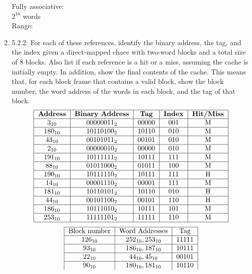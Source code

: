 \documentclass[10pt,letterpaper]{article}
\begin{document}
\begin{enumerate}[label=\textbf{Problem \arabic*.}]
Fully associative:\\
$2^16$ words\\
Range:
\item 5.2.2: For each of these references, identify the binary address, the tag, and the index given a direct-mapped chace with two-word blocks and a total size of 8 blocks. Also list if each reference is a hit or a miss, assuming the cache is initially empty. In addition, show the final contents of the cache. This means that, for each block frame that contains a valid block, show the block number, the word address of the words in each block, and the tag of that block.
	\[\begin{tabular} {|c|c|c|c|c|}
	\hline
	\textbf{Address} & \textbf{Binary Address} & \textbf{Tag} & \textbf{Index} & \textbf{Hit/Miss} \\
	\hline
	$3_{10}$ & $00000011_2$ & 00000 & 001 & M \\
	\hline
	$180_{10}$ & $10110100_2$ & 10110 & 010 & M \\
	\hline
	$43_{10}$ & $00101011_2$ & 00101 & 010 & M \\
	\hline
	$2_{10}$ & $00000010_2$ & 00000 & 010 & M \\
	\hline
	$191_{10}$ & $10111111_2$ & 10111 & 111 & M \\
	\hline
	$88_{10}$ & $01011000_2$ & 01011 & 100 & M \\
	\hline
	$190_{10}$ & $10111110_2$ & 10111 & 111 & H \\
	\hline
	$14_{10}$ & $00001110_2$ & 00001 & 111 & M \\
	\hline
	$181_{10}$ & $10110101_2$ & 10110 & 010 & H \\
	\hline
	$44_{10}$ & $00101100_2$ & 00101 & 110 & H \\
	\hline
	$186_{10}$ & $10111010_2$ & 10111 & 101 & M \\
	\hline
	$253_{10}$ & $11111101_2$ & 11111 & 110 & M \\
	\hline
	\end{tabular}\]
	\[\begin{tabular} {|c|c|c|}
	\hline
	Block number & Word Addresses & Tag \\
	\hline
	$126_{10}$ & $252_{10},253_{10}$ & 11111 \\ 
	\hline
	$93_{10}$ & $186_{10},187_{10}$ & 10111 \\ 
	\hline
	$22_{10}$ & $44_{10},45_{10}$ & 00101 \\ 
	\hline
	$90_{10}$ & $180_{10},181_{10}$ & 10110 \\ 

\end{tabular}\]
\end{enumerate}
\end{document}
